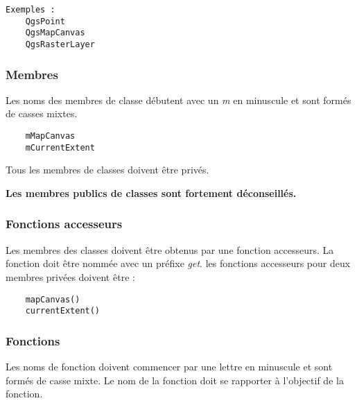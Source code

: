 \begin{verbatim}
Exemples :
	QgsPoint
	QgsMapCanvas
	QgsRasterLayer
\end{verbatim}

\subsubsection{Membres}
Les noms des membres de classe d\'ebutent avec un \textit{m} en minuscule et sont form\'es de casses mixtes.

\begin{verbatim}
	mMapCanvas	
	mCurrentExtent
\end{verbatim}

Tous les membres de classes doivent \^etre priv\'es.

\textbf{Les membres publics de classes sont fortement d\'econseill\'es.}

\subsubsection{Fonctions accesseurs}
Les membres des classes doivent \^etre obtenus par une fonction accesseurs. La fonction doit \^etre nomm\'ee avec un pr\'efixe \textit{get}. les fonctions accesseurs pour deux membres priv\'ees doivent \^etre :
\begin{verbatim}
	mapCanvas()
	currentExtent()
\end{verbatim}

\subsubsection{Fonctions}
Les noms de fonction doivent commencer par une lettre en minuscule et sont form\'es de casse mixte. Le nom de la fonction doit se rapporter \`a l'objectif de la fonction.

